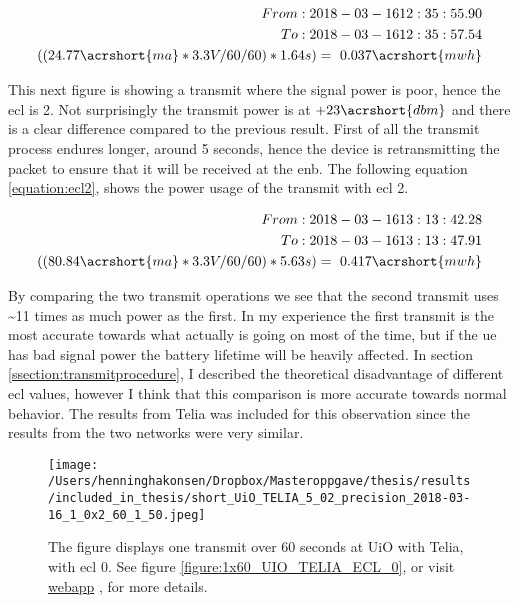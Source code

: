 \documentclass[USenglish]{ifimaster}  %
\begin{document}
\begin{equation} \label{equation:ecl0}
\begin{aligned}
From: 2018-03-16 12:35:55.90 \\
To: 2018-03-16 12:35:57.54 \\
((24.77\acrshort{ma} * 3.3V / 60 / 60 ) * 1.64s) = ~0.037\acrshort{mwh} \\
\end{aligned}
\end{equation}

This next figure is showing a transmit where the signal power is poor, hence the \acrshort{ecl} is 2. Not surprisingly the transmit power is at ${+23 \acrshort{dbm}}$ and there is a clear difference compared to the previous result. First of all the transmit process endures longer, around 5 seconds, hence the device is retransmitting the packet to ensure that it will be received at the \acrshort{enb}. The following equation \vref{equation:ecl2}, shows the power usage of the transmit with \acrshort{ecl} 2.

\begin{equation} \label{equation:ecl2}
\begin{aligned}
From: 2018-03-16 13:13:42.28 \\
To: 2018-03-16 13:13:47.91 \\
((80.84\acrshort{ma} * 3.3V / 60 / 60 ) * 5.63s) = ~0.417\acrshort{mwh} \\
\end{aligned}
\end{equation}

By comparing the two transmit operations we see that the second transmit uses \textasciitilde{}11 times as much power as the first. In my experience the first transmit is the most accurate towards what actually is going on most of the time, but if the \acrshort{ue} has bad signal power the battery lifetime will be heavily affected. In section \vref{ssection:transmitprocedure}, I described the theoretical disadvantage of different \acrshort{ecl} values, however I think that this comparison is more accurate towards normal behavior. The results from Telia was included for this observation since the results from the two networks were very similar.

\begin{figure}[H]
  \centering
  \texttt{[image: /Users/henninghakonsen/Dropbox/Masteroppgave/thesis/results/included\_in\_thesis/short\_UiO\_TELIA\_5\_02\_precision\_2018-03-16\_1\_0x2\_60\_1\_50.jpeg]}
  \caption[Short-term test - \acrshort{ecl} 0]{The figure displays one transmit over 60 seconds at UiO with Telia, with \acrshort{ecl} 0. See figure \vref{figure:1x60_UIO_TELIA_ECL_0}, or visit \href{http://158.39.77.97:9000/\#/results/UiO\_TELIA\_5.02\_precision\_2018-03-16\_1\_0x2\_60\_1\_50}{webapp} \cite{online:result5}, for more details.}
  \label{figure:1x60_UIO_TELIA_ECL_0_SHORT}
\end{figure}
\end{document}

